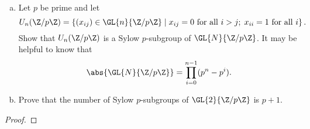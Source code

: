\documentclass[10pt]{amsart}
\begin{document}
\begin{thm}
  \begin{enumerate}[(a)]
  \item
    Let $p$ be prime and let 
    $$U_n(\Z/p\Z) = \left\{(x_{ij}) \in \GL{n}{\Z/p\Z} \;\middle\vert\; x_{ij} = 0 \text{ for all } i > j;\; x_{ii} = 1 \text{ for all } i \right\}.$$
    Show that $U_n(\Z/p\Z)$ is a Sylow $p$-subgroup of $\GL{N}{\Z/p\Z}$.
    It may be helpful to know that 
    $$\abs{\GL{N}{\Z/p\Z}} = \prod_{i=0}^{n-1}(p^n - p^i).$$
  \item
    Prove that the number of Sylow $p$-subgroups of $\GL{2}{\Z/p\Z}$ is $p + 1$.
  \end{enumerate}
  \begin{proof}
  \end{proof}
\end{thm}
\end{document}
